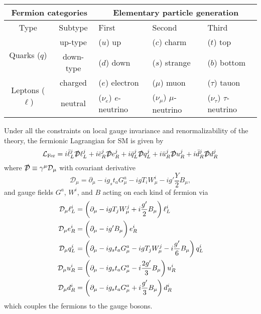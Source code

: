 \begin{center}
	\begin{tabular}{|c||c||l|l|l|}
		\hline \multicolumn{2}{|c||}{ \textbf{Fermion categories} } & \multicolumn{3}{c|}{\textbf{ Elementary particle generation} } \bigstrut\\
		\hline \hline Type & Subtype & First & Second & Third \bigstrut\\
		\hline\hline \multirow{2}{*}{ Quarks ($q$) }  & up-type & ($u$) up & ($c$) charm & ($t$) top  \bigstrut \\
		\cline { 2 - 5 }  & down-type & ($d$) down & ($s$) strange & ($b$) bottom  \bigstrut\\
		\hline\hline \multirow{2}{*}{ Leptons ($\ell$) } & charged & ($e$) electron & ($\mu$) muon & ($\tau$) tauon \bigstrut\\
		\cline { 2 - 5 } & neutral & ($\nu_e$) $e$-neutrino & ($\nu_\mu$) $\mu$-neutrino & ($\nu_\tau$) $\tau$-neutrino \bigstrut\\
		\hline
	\end{tabular}
	\label{tab-generations}
\end{center}

Under all the constraints on local gauge invariance and renormalizability of the theory, the fermionic Lagrangian for SM is given by
\begin{equation}
	\mathcal{L}_{\mathrm{Fer}}
	=i \bar{\ell}_{L}^j \slashed{\mathcal D} \ell_{L}^j
	+i \bar{e}_{R}^j \slashed{\mathcal D} e_{R}^j
	+i{\bar{q}}_{L}^j  \slashed{\mathcal D}  q_{L}^j
	+i{\bar{u}}_{R}^j  \slashed{\mathcal D}  u_{R}^j
	+i{\bar{d}}_{R}^j  \slashed{\mathcal D}  d_{R}^j
\end{equation}
where $\slashed{\mathcal D}\equiv \gamma ^\mu \mathcal D_\mu$ with covariant derivative
\begin{equation}
	\mathcal D_\mu = \partial_\mu -ig_st_ aG^a_\mu -ig T_i W_\mu^i -ig'\frac Y2 B_\mu,
\end{equation}
and gauge fields $G^a$, $W^i$, and $B$ acting on each kind of fermion via
\begin{equation}
\begin{aligned}
	\mathcal D_{ \mu} \ell_L^i &=\fac{\partial_{\mu}-i g T_j W_{\mu}^{j}+i \frac{g^{\prime}}2 B_{\mu}} \ell_L^i \\
	\mathcal D_{ \mu} e_R^i &=\fac{\partial_{\mu} -  i g^{\prime}  B_{\mu}\vph}e_R^i \\
	\mathcal D_{ \mu} q_L^i &=\fac{\partial_{\mu}-i g_{s} t_{a} G_{\mu}^{a}-i g T_j W_{\mu}^{j}-i \frac{g^{\prime}}{6} B_{\mu}} q_L^i \\
	\mathcal D_{ \mu} u_R^i &=\fac{\partial_{\mu} -i g_{s} t_{a} G_{\mu}^{a} - i \frac{2g^{\prime}}3  B_{\mu}}u_R^i \\
	\mathcal D_{ \mu} d_R^i &=\fac{\partial_{\mu} -i g_{s} t_{a} G_{\mu}^{a} + i \frac{g^{\prime}}3  B_{\mu}}d_R^i \\
\end{aligned}
\end{equation}
which couples the fermions to the gauge bosons. 
